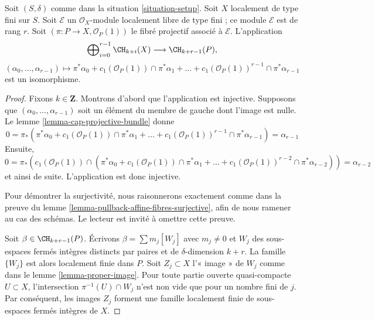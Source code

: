 \begin{lemma}
\label{lemma-chow-ring-projective-bundle}
Soit $(S, \delta)$ comme dans la situation \ref{situation-setup}. Soit $X$
localement de type fini sur $S$. Soit $\mathcal{E}$ un $\mathcal{O}_X$-module
localement libre de type fini ; ce module $\mathcal{E}$ est de rang $r$. Soit
$(\pi : P \to X, \mathcal{O}_P(1))$ le fibré projectif associé à
$\mathcal{E}$. L'application
$$
\bigoplus\nolimits_{i = 0}^{r - 1}
\CH_{k + i}(X)
\longrightarrow
\CH_{k + r - 1}(P),
$$
$$
(\alpha_0, \ldots, \alpha_{r-1})
\longmapsto
\pi^*\alpha_0 +
c_1(\mathcal{O}_P(1)) \cap \pi^*\alpha_1
+ \ldots +
c_1(\mathcal{O}_P(1))^{r - 1} \cap \pi^*\alpha_{r-1}
$$
est un isomorphisme.
\end{lemma}

\begin{proof}
Fixons $k \in \mathbf{Z}$. Montrons d'abord que l'application est injective.
Supposons que $(\alpha_0, \ldots, \alpha_{r - 1})$ soit un élément du membre de
gauche dont l'image est nulle. Le lemme \ref{lemma-cap-projective-bundle} donne
$$
0 = \pi_*(\pi^*\alpha_0 +
c_1(\mathcal{O}_P(1)) \cap \pi^*\alpha_1
+ \ldots +
c_1(\mathcal{O}_P(1))^{r - 1} \cap \pi^*\alpha_{r-1})
= \alpha_{r - 1}
$$
Ensuite,
$$
0 = \pi_*(c_1(\mathcal{O}_P(1)) \cap (\pi^*\alpha_0 +
c_1(\mathcal{O}_P(1)) \cap \pi^*\alpha_1
+ \ldots +
c_1(\mathcal{O}_P(1))^{r - 2} \cap \pi^*\alpha_{r - 2}))
= \alpha_{r - 2}
$$
et ainsi de suite. L'application est donc injective.

\medskip\noindent
Pour démontrer la surjectivité, nous raisonnerons exactement comme dans la
preuve du lemme \ref{lemma-pullback-affine-fibres-surjective}, afin de nous
ramener au cas des schémas. Le lecteur est invité à omettre cette preuve.

\medskip\noindent
Soit $\beta \in \CH_{k + r - 1}(P)$. Écrivons $\beta = \sum m_j[W_j]$ avec
$m_j \not = 0$ et $W_j$ des sous-espaces fermés intègres distincts par paires
et de $\delta$-dimension $k + r$. La famille $\{W_j\}$ est alors localement
finie dans $P$. Soit $Z_j \subset X$ l'« image » de $W_j$ comme dans le lemme
\ref{lemma-proper-image}. Pour toute partie ouverte quasi-compacte $U \subset
X$, l'intersection $\pi^{-1}(U) \cap W_j$ n'est non vide que pour un nombre
fini de $j$. Par conséquent, les images $Z_j$ forment une famille localement
finie de sous-espaces fermés intègres de $X$.


\end{proof}
